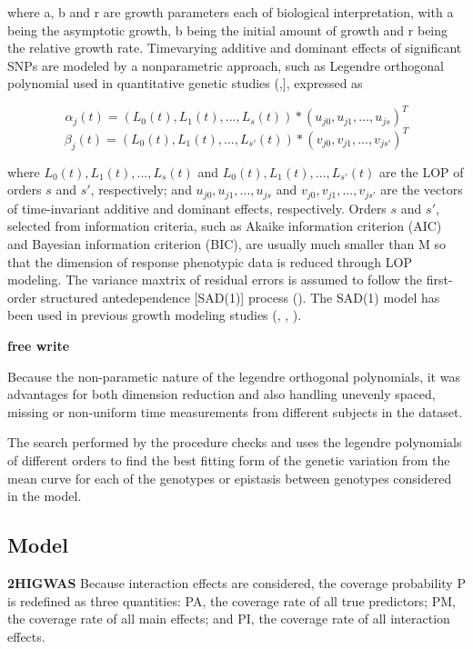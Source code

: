 \documentclass[11pt,]{book}
\theoremstyle{definition}
\theoremstyle{definition}
\theoremstyle{remark}
\begin{document}
where a, b and r are growth parameters each of biological
interpretation, with a being the asymptotic growth, b being the initial
amount of growth and r being the relative growth rate. Timevarying
additive and dominant effects of significant SNPs are modeled by a
nonparametric approach, such as Legendre orthogonal polynomial used in
quantitative genetic studies
(\cite{olori1999estimating},\cite{li2010functional}{]}, expressed as

\[ \alpha_j(t) = (L_0(t), L_1(t), ... , L_s(t))*(u_{j0}, u_{j1},...,u_{js})^T \]
\[ \beta_j(t) = (L_0(t), L_1(t), ... , L_{s'}(t))*(v_{j0}, v_{j1},...,v_{js'})^T \]

where \(L_0(t), L_1(t), ... , L_s(t)\) and
\(L_0(t), L_1(t), ... , L_{s'}(t)\) are the LOP of orders \(s\) and
\(s'\), respectively; and \(u_{j0}, u_{j1},...,u_{js}\) and
\(v_{j0}, v_{j1},...,v_{js'}\) are the vectors of time-invariant
additive and dominant effects, respectively. Orders \(s\) and \(s'\),
selected from information criteria, such as Akaike information criterion
(AIC) and Bayesian information criterion (BIC), are usually much smaller
than M so that the dimension of response phenotypic data is reduced
through LOP modeling. The variance maxtrix of residual errors is assumed
to follow the first-order structured antedependence {[}SAD(1){]} process
(\cite{li2010functional}). The SAD(1) model has been used in previous
growth modeling studies (\cite{li2010functional},
\cite{ahn2010functional}, \cite{das2011dynamic}).

\textbf{free write}

Because the non-parametic nature of the legendre orthogonal polynomials,
it was advantages for both dimension reduction and also handling
unevenly spaced, missing or non-uniform time measurements from different
subjects in the dataset.

The search performed by the procedure checks and uses the legendre
polynomials of different orders to find the best fitting form of the
genetic variation from the mean curve for each of the genotypes or
epistasis between genotypes considered in the model.

\subsection{Model}\label{model}

\textbf{2HIGWAS} Because interaction effects are considered, the
coverage probability P is redefined as three quantities: PA, the
coverage rate of all true predictors; PM, the coverage rate of all main
effects; and PI, the coverage rate of all interaction effects.
\end{document}
